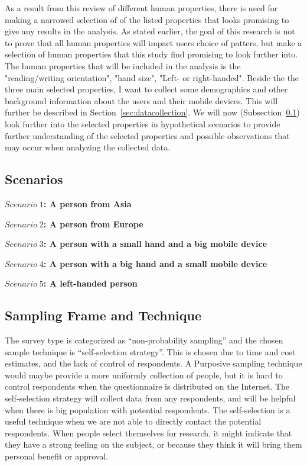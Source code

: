   As a result from this review of different human properties, there is need for making a narrowed selection of of the listed properties that looks promising to give any results in the analysis. As stated earlier, the goal of this research is not to prove that all human properties will impact users choice of patters, but make a selection of human properties that this study find promising to look further into. The human properties that will be included in the analysis is the  "reading/writing orientation", "hand size", "Left- or right-handed". Beside the the three main selected properties, I want to collect some demographics and other background information about the users and their mobile devices. This will further be described in Section~\ref{sec:datacollection}. We will now (Subsection~\ref{sec:scenario}) look further into the selected properties in hypothetical scenarios to provide further understanding of the selected properties and possible observations that may occur when analyzing the collected data. 

  \subsection{Scenarios}\label{sec:scenario}

    {\bf $Scenario\; 1$: A person from Asia}

    {\bf $Scenario\; 2$: A person from Europe}

    {\bf $Scenario\; 3$: A person with a small hand and a big mobile device}

    {\bf $Scenario\; 4$: A person with a big hand and a small mobile device}

    {\bf $Scenario\; 5$: A left-handed person}

  \subsection{Sampling Frame and Technique} \label{sec:sampling}
    
    The survey type is categorized as ``non-probability sampling'' and the chosen sample technique is ``self-selection strategy''. This is chosen due to time and cost estimates, and the lack of control of respondents. A Purposive sampling technique would maybe provide a more uniformly collection of people, but it is hard to control respondents when the questionnaire is distributed on the Internet. The self-selection strategy will collect data from any respondents, and will be helpful when there is big population with potential respondents. The self-selection is a useful technique when we are not able to directly contact the potential respondents. When people select themselves for research, it might indicate that they have a strong feeling on the subject, or because they think it will bring them personal benefit or approval. 

